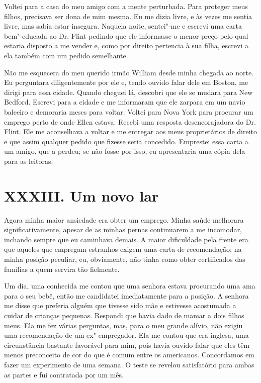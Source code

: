 Voltei para a casa do meu amigo com a
mente perturbada. Para proteger meus filhos, precisava ser dona de mim
mesma. Eu me dizia livre, e às vezes me sentia livre, mas sabia estar
insegura. Naquela noite, sentei"-me e escrevi uma carta bem"-educada ao
Dr. Flint pedindo que ele informasse o menor preço pelo qual estaria
disposto a me vender e, como por direito pertencia à sua filha, escrevi
a ela também com um pedido semelhante.

Não me esquecera do meu querido irmão William desde minha chegada ao
norte. Eu perguntara diligentemente por ele e, tendo ouvido falar dele
em Boston, me dirigi para essa cidade. Quando cheguei lá, descobri que
ele se mudara para New Bedford. Escrevi para a cidade e me informaram
que ele zarpara em um navio baleeiro e demoraria meses para voltar.
Voltei para Nova York para procurar um emprego perto de onde Ellen
estava. Recebi uma resposta desencorajadora do Dr. Flint. Ele me
aconselhava a voltar e me entregar aos meus proprietários de direito e
que assim qualquer pedido que fizesse seria concedido. Emprestei essa
carta a um amigo, que a perdeu; se não fosse por isso, eu apresentaria
uma cópia dela para as leitoras.

\chapter{XXXIII. Um novo lar}

Agora minha maior ansiedade era obter
um emprego. Minha saúde melhorara significativamente, apesar de as
minhas pernas continuarem a me incomodar, inchando sempre que eu
caminhava demais. A maior dificuldade pela frente era que aqueles que
empregam estranhos exigem uma carta de recomendação; na minha posição
peculiar, eu, obviamente, não tinha como obter certificados das famílias
a quem servira tão fielmente.

Um dia, uma conhecida me contou que uma
senhora estava procurando uma ama para o seu bebê, então me candidatei
imediatamente para a posição. A senhora me disse que preferia alguém que
tivesse sido mãe e estivesse acostumada a cuidar de crianças pequenas.
Respondi que havia dado de mamar a dois filhos meus. Ela me fez várias
perguntas, mas, para o meu grande alívio, não exigiu uma recomendação de
um ex"-empregador. Ela me contou que era inglesa, uma circunstância
bastante favorável para mim, pois havia ouvido falar que eles têm menos
preconceito de cor do que é comum entre os americanos. Concordamos em
fazer um experimento de uma semana. O teste se revelou satisfatório para
ambas as partes e fui contratada por um mês.

